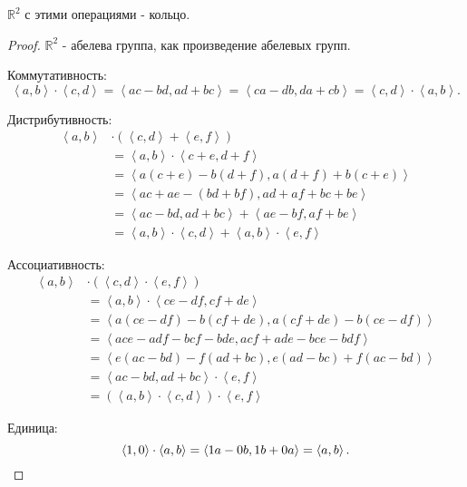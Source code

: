 \begin{theorem} 
    $\mathbb{R}^2$ с этими операциями - кольцо.
    \begin{proof}
        $\mathbb{R}^2$ - абелева группа, как произведение абелевых групп.
        
        Коммутативность:
            \[ \left<a, b\right> \cdot \left<c, d\right> = \left<ac-bd, ad+bc\right> = \left<ca-db, da+cb\right> = \left<c, d\right> \cdot \left<a, b\right>.\]

        Дистрибутивность:
            \begin{equation*}
                \begin{split}
                    \left<a, b\right> &\cdot \left( \left<c, d\right> + \left<e, f\right> \right) \\
                                      &= \left<a,b\right> \cdot  \left<c+e, d+f\right>\\
                                      &= \left<a(c+e)-b(d+f), a(d+f)+b(c+e)\right>\\
                                      &= \left<ac+ae-(bd+bf), ad+af+bc+be\right>\\
                                      &= \left<ac-bd, ad+bc\right> + \left<ae-bf, af+be\right>\\
                                      &= \left<a, b\right>\cdot \left<c, d\right> + \left<a, b\right> \cdot \left<e, f\right>
                \end{split}
            \end{equation*}

        Ассоциативность:
            \begin{equation*}
                \begin{split}
                    \left<a,b\right> &\cdot \left( \left<c, d\right> \cdot \left<e, f\right> \right)\\
                                     &= \left<a, b\right> \cdot \left<ce-df, cf+de\right>\\
                                     &= \left<a(ce-df)-b(cf+de), a(cf+de)-b(ce-df)\right>\\
                                     &= \left<ace-adf-bcf-bde, acf+ade-bce-bdf\right>\\
                                     &= \left<e(ac-bd)-f(ad+bc), e(ad-bc)+f(ac-bd)\right>\\
                                     &= \left<ac-bd, ad+bc\right> \cdot \left<e, f\right>\\
                                     &= (\left<a, b\right> \cdot \left<c, d\right>) \cdot \left<e, f\right>
                \end{split}
            \end{equation*}    
        
        Единица:
            \[ \left<1, 0\right> \cdot \left<a, b\right> = \left<1a-0b, 1b+0a\right> = \left<a, b\right>.\qedhere\] 
    \end{proof}
\end{theorem}


